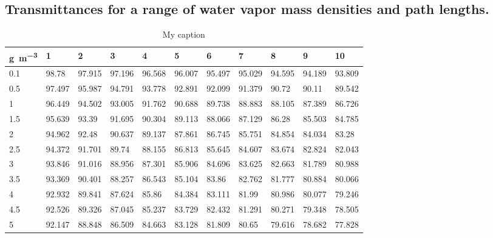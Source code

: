 \begin{bibunit}

\chapter{Transmittances for a range of water vapor mass densities and path lengths.}
\label{appendixa}


\newpage 
\begin{table}[]
	\centering
	\caption{My caption}
	\label{my-label}
	\begin{tabular}{lllllllllll}
		\toprule
		\si{\gram\per\meter\cubed}& 1      & 2      & 3      & 4      & 5      & 6      & 7      & 8      & 9      & 10     \\
		\midrule
		0.1  & 98.78  & 97.915 & 97.196 & 96.568 & 96.007 & 95.497 & 95.029 & 94.595 & 94.189 & 93.809 \\
		0.5  & 97.497 & 95.987 & 94.791 & 93.778 & 92.891 & 92.099 & 91.379 & 90.72  & 90.11  & 89.542 \\
		1    & 96.449 & 94.502 & 93.005 & 91.762 & 90.688 & 89.738 & 88.883 & 88.105 & 87.389 & 86.726 \\
		1.5  & 95.639 & 93.39  & 91.695 & 90.304 & 89.113 & 88.066 & 87.129 & 86.28  & 85.503 & 84.785 \\
		2    & 94.962 & 92.48  & 90.637 & 89.137 & 87.861 & 86.745 & 85.751 & 84.854 & 84.034 & 83.28  \\
		2.5  & 94.372 & 91.701 & 89.74  & 88.155 & 86.813 & 85.645 & 84.607 & 83.674 & 82.824 & 82.043 \\
		3    & 93.846 & 91.016 & 88.956 & 87.301 & 85.906 & 84.696 & 83.625 & 82.663 & 81.789 & 80.988 \\
		3.5  & 93.369 & 90.401 & 88.257 & 86.543 & 85.104 & 83.86  & 82.762 & 81.777 & 80.884 & 80.066 \\
		4    & 92.932 & 89.841 & 87.624 & 85.86  & 84.384 & 83.111 & 81.99  & 80.986 & 80.077 & 79.246 \\
		4.5  & 92.526 & 89.326 & 87.045 & 85.237 & 83.729 & 82.432 & 81.291 & 80.271 & 79.348 & 78.505 \\
		5    & 92.147 & 88.848 & 86.509 & 84.663 & 83.128 & 81.809 & 80.65  & 79.616 & 78.682 & 77.828 \\

\end{tabular}
\end{table}
\end{bibunit}
